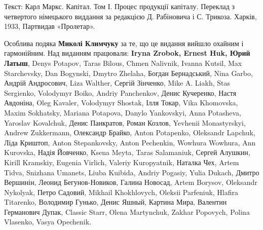 
Текст: Карл Маркс. Капітал. Том І. Процес продукції капіталу. Переклад з четвертого німецького виддання за редакцією Д. Рабіновича і С. Трикоза. Харків, 1933, Партвидав «Пролетар».

\smallskip\noindent Особлива подяка \textbf{Миколі Климчуку} за те,
що це видання вийшло охайним і гармонійним. Над виданням працювали:
\textbf{Iryna Zrobok, Ernest Huk, Юрий Латыш},
Denys Po\-ta\-pov, Taras Bilous, Chmen Nalivnik, Ivanna Kutsil, Max Starchevsky, Dan Bogynski, Dmytro Zhelaha, Богдан Бернадський, Nina Garbo, Андрій Андросович, Liza Walther, Сергій Зінченко,
{\small
Mike A. Liakh, Stas Sergienko, Volodymyr Boiko, Andriy Panchenkov, Денис Кучеренко, Настя Авдоніна, Oleg Kavaler, Volodymyr Shostak, Ілля Токар, Vika Khomovska, Maxim Sokhatsky, Mariana Potapova, Danylo Yankovskyi, Anna Potasheva, Yaroslav Kovalchuk, Денис Панкратов, Роман Козлов, \textenglish{Yevhenii Mo\-nas\-tyr\-skyi}, Andrew Zukkermann, Олександр Брайко, Anton Potapenko, Oleksandr Lapchuk, Ліда Криштоп, Anton Stepankovsky, Anton Pechenkin, Wowhura Wowhura, Ann Kurovska, Надія Йовченко, Ksena Meyta, Taras Salamaniuk, Сергей Алушкин, Kirill Kramskiy, Eugenia Virlich, Valeriy Kuropyatnik, Наталка Чех, Artem Tidva, Snizhana Umanets, Liuba Kuibida, Andriy Pogasiy, Yulia Dukach, Дмитро Вершинін, Леонид Бегунов-Новиков, Галина Новосад, Artem Borysov, Oleksandr Nykolyak, Петро Садовий, Mikhail Khokhlovych, Oleksii Parfeniuk, Hlafira Titarenko, Володимир Гунько, Денис Яшный, Картина Мира, Валентин Германович Дупак, Classic Starr, Olena Martynchuk, Zakhar Popovych, Polina Vlasenko, Vasya Opechenik.}

\cleardoublepage